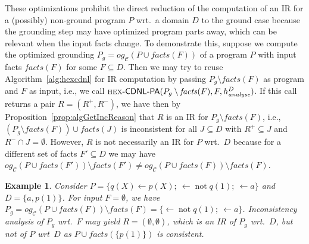 \documentclass[11pt,fleqn,twoside]{article}
\def\naf{\ensuremath{\mathop{not}}}
\newcommand\hex{{\sc hex}\xspace}
\newcommand{\Program}{\ensuremath{P}}
\newcommand{\toFacts}[1]{\mathit{facts}(#1)}
\newcommand{\CDNLHEX}{\textsf{\hex-CDNL-PA}}
\newtheorem{example}{Example}
\begin{document}
			These optimizations prohibit the direct reduction of the computation of an IR for a (possibly) non-ground program $\Program$ wrt.~a domain $D$
			to the ground case because the grounding step may have optimized program parts away, which can be relevant when the input facts change.
			To demonstrate this,
			suppose we compute the optimized grounding $\Program_g = \mathit{og}_{\mathcal{C}}(\Program \cup \toFacts{F})$
			of a program $\Program$ with input facts $\toFacts{F}$ for some $F \subseteq D$.
			Then we may try to reuse Algorithm~\ref{alg:hexcdnl} for IR computation by passing $\Program_g \setminus \toFacts{F}$ as program and $F$ as input,
			i.e., we call $\text{\CDNLHEX}(\Program_g \setminus \toFacts{F}, F, h_{\mathit{analyse}}^D)$.
			If this call returns a pair $R = (R^{+}, R^{-})$,
			we have then by Proposition~\ref{prop:algGetIncReason} that
			$R$ is an IR for $\Program_g \setminus \toFacts{F}$, i.e., $(\Program_g \setminus \toFacts{F}) \cup \toFacts{J}$
			is inconsistent for all $J \subseteq D$ with $R^{+} \subseteq J$ and $R^{-} \cap J = \emptyset$.
			However, $R$ is not necessarily an IR for $\Program$ wrt.~$D$ because for a different set of facts $F' \subseteq D$
			we may have $\mathit{og}_{\mathcal{C}}(\Program \cup \toFacts{F'}) \setminus \toFacts{F'} \not= \mathit{og}_{\mathcal{C}}(\Program \cup \toFacts{F}) \setminus \toFacts{F}$.

			\begin{example}
				\label{ex:ogrounding}
				Consider $\Program = \{ q(X) \leftarrow p(X); \ \leftarrow \naf q(1); \ \leftarrow a \}$ and $D = \{ a, p(1) \}$.
				For input $F = \emptyset$,
				we have $\Program_g = \mathit{og}_{\mathcal{C}}(\Program \cup \toFacts{F}) \setminus \toFacts{F} = \{ \leftarrow \naf q(1); \ \leftarrow a \}$.
				Inconsistency analysis of $\Program_g$ wrt.~$F$ may yield $R = (\emptyset, \emptyset)$, which is an IR of $\Program_g$ wrt.~$D$,
				but not of $\Program$ wrt~$D$ as $\Program \cup \toFacts{\{ p(1) \}}$ is consistent.
			\end{example}
\end{document}
